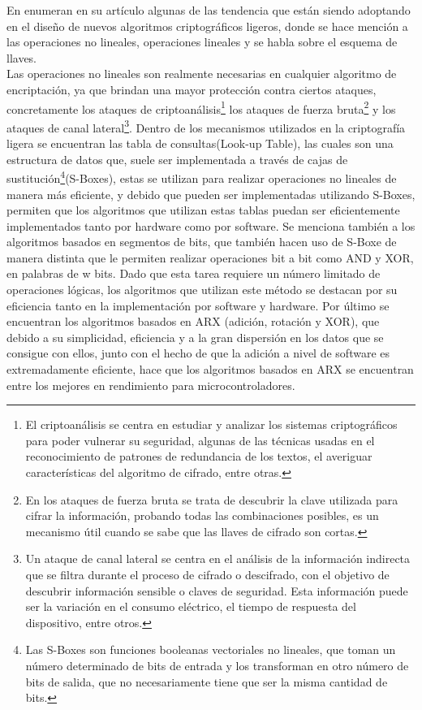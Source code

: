 \documentclass[]{article}
\begin{document}
En \parencite{biryukov2017state} enumeran en su artículo algunas de las tendencia que están siendo adoptando en el diseño de nuevos algoritmos criptográficos ligeros, donde se hace mención a  las operaciones no lineales, operaciones lineales y se habla sobre el esquema de llaves.
\\ Las operaciones no lineales son realmente necesarias en cualquier algoritmo de encriptación, ya que brindan una mayor protección contra ciertos ataques, concretamente los ataques de criptoanálisis\footnote{El criptoanálisis se centra en estudiar y analizar los sistemas criptográficos para poder vulnerar su seguridad, algunas de las técnicas usadas en el reconocimiento de patrones de redundancia de los textos, el averiguar características del algoritmo de cifrado, entre otras.} los ataques de fuerza bruta\footnote{En los ataques de fuerza bruta se trata de descubrir la clave utilizada para cifrar la información, probando todas las combinaciones posibles, es un mecanismo útil cuando se sabe que las llaves de cifrado son cortas.} y los ataques de canal lateral\footnote{Un ataque de canal lateral se centra en el análisis de la información indirecta que se filtra durante el proceso de cifrado o descifrado, con el objetivo de descubrir información sensible o claves de seguridad. Esta información puede ser la variación en el consumo eléctrico, el tiempo de respuesta del dispositivo, entre otros.}. Dentro de los mecanismos utilizados en la criptografía ligera se encuentran las tabla de consultas(Look-up Table), las cuales son una estructura de datos que, suele ser implementada a través de cajas de sustitución\footnote{Las S-Boxes son funciones booleanas vectoriales no lineales, que toman un número determinado de bits de entrada y los transforman en otro número de bits de salida, que no necesariamente tiene que ser la misma cantidad de bits.}(S-Boxes), estas se utilizan para realizar operaciones no lineales de manera más eficiente, y debido que pueden ser implementadas utilizando S-Boxes, permiten que los algoritmos que utilizan estas tablas puedan ser eficientemente implementados tanto por hardware como por software. Se menciona también a los algoritmos basados en segmentos de bits, que también hacen uso de S-Boxe de manera distinta que le permiten realizar operaciones bit a bit como AND y XOR, en palabras de w bits. Dado que esta tarea requiere un número limitado de operaciones lógicas, los algoritmos que utilizan este método se destacan por su eficiencia tanto en la implementación por software y hardware. Por último se encuentran los algoritmos basados en ARX (adición, rotación y XOR), que debido a su simplicidad, eficiencia y a la gran dispersión en los datos que se consigue con ellos, junto con el hecho de que la adición a nivel de software es extremadamente eficiente, hace que los algoritmos basados en ARX se encuentran entre los mejores en rendimiento para microcontroladores.
\end{document}
